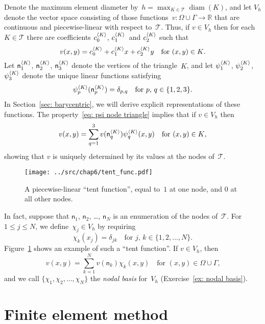 Denote the maximum element diameter 
by~$h=\max_{K\in\mathcal{T}}\operatorname{diam}(K)$, and let $V_h$ denote the 
vector space consisting of those functions~$v:\Omega\cup\Gamma\to\mathbb{R}$ 
that are continuous and piecewise-linear with respect to~$\mathcal{T}$.  Thus,
if $v\in V_h$ then for each~$K\in\mathcal{T}$ there are coefficients 
$c^{\langle K\rangle}_0$, $c^{\langle K\rangle}_1$~and $c^{\langle K\rangle}_2$ such that
\begin{equation}\label{eq: v K 1 x y}
v(x,y)=c^{\langle K\rangle}_0+c^{\langle K\rangle}_1x+c^{\langle K\rangle}_2y
	\quad\text{for $(x,y)\in K$.}
\end{equation}
Let $\mathsf{n}^{\langle K\rangle}_1$, $\mathsf{n}^{\langle K\rangle}_2$, $\mathsf{n}^{\langle K\rangle}_3$ 
denote the vertices of the triangle~$K$, and let $\psi^{\langle K\rangle}_1$, 
$\psi^{\langle K\rangle}_2$, $\psi^{\langle K\rangle}_3$ denote the unique linear functions 
satisfying
\begin{equation}\label{eq: psi node triangle}
\psi^{\langle K\rangle}_p(\mathsf{n}^{\langle K\rangle}_p)=\delta_{p,q}
	\quad\text{for $p$, $q\in\{1,2,3\}$.}
\end{equation}
In Section~\ref{sec: barycentric}, we will derive explicit representations of 
these functions.  The property~\eqref{eq: psi node triangle} implies that if 
$v\in V_h$ then
\[
v(x,y)=\sum_{q=1}^3v(\mathsf{n}^{\langle K\rangle}_q)\psi^{\langle K\rangle}_q(x,y)
	\quad\text{for $(x,y)\in K$,}
\]
showing that $v$ is uniquely determined by its values at the nodes 
of~$\mathcal{T}$.

\begin{figure}
\caption{A piecewise-linear ``tent function'', equal to~$1$ at one node, and 
$0$ at all other nodes.}\label{fig: tent func}
\begin{center}
\texttt{[image: ../src/chap6/tent\_func.pdf]}
\end{center}
\end{figure}

In fact, suppose that $\mathsf{n}_1$, $\mathsf{n}_2$, \dots, $\mathsf{n}_N$ is 
an enumeration of the nodes of~$\mathcal{T}$.  For~$1\le j\le N$, we 
define~$\chi_j\in V_h$ by requiring
\[
\chi_k(x_j)=\delta_{jk}\quad\text{for $j$, $k\in\{1, 2, \dots, N\}$.}
\]
Figure~\ref{fig: tent func} shows an example of such a ``tent function''.  
If $v\in V_h$, then
\[
v(x,y)=\sum_{k=1}^N v(\mathsf{n}_k)\chi_k(x,y)
	\quad\text{for $(x,y)\in\Omega\cup\Gamma$,}
\]
and we call $\{\chi_1,\chi_2,\ldots,\chi_N\}$ the \emph{nodal basis} for~$V_h$
(Exercise~\ref{ex: nodal basis}).

\section{Finite element method}

